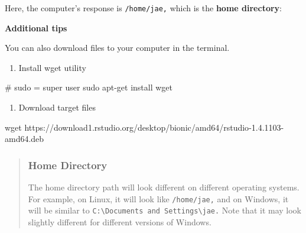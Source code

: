 \documentclass[
  letterpaper,
  DIV=11,
  numbers=noendperiod]{scrreprt}
\newenvironment{Shaded}{\begin{snugshade}}{\end{snugshade}}
\newcommand{\CommentTok}[1]{\textcolor[rgb]{0.37,0.37,0.37}{#1}}
\newcommand{\ExtensionTok}[1]{\textcolor[rgb]{0.00,0.23,0.31}{#1}}
\newcommand{\FunctionTok}[1]{\textcolor[rgb]{0.28,0.35,0.67}{#1}}
\newcommand{\NormalTok}[1]{\textcolor[rgb]{0.00,0.23,0.31}{#1}}
\providecommand{\tightlist}{%
  \setlength{\itemsep}{0pt}\setlength{\parskip}{0pt}}\usepackage{longtable,booktabs,array}
\begin{document}
Here, the computer's response is \texttt{/home/jae,} which is the
\textbf{home directory}:

\begin{Shaded}
\end{Shaded}

\textbf{Additional tips}

You can also download files to your computer in the terminal.

\begin{enumerate}
\def\labelenumi{\arabic{enumi}.}
\tightlist
\item
  Install wget utility
\end{enumerate}

\begin{Shaded}
\begin{Highlighting}[]
\CommentTok{\# sudo = super user }
\FunctionTok{sudo}\NormalTok{ apt{-}get install wget }
\end{Highlighting}
\end{Shaded}

\begin{enumerate}
\def\labelenumi{\arabic{enumi}.}
\setcounter{enumi}{1}
\tightlist
\item
  Download target files
\end{enumerate}

\begin{Shaded}
\begin{Highlighting}[]
\FunctionTok{wget}\NormalTok{ https://download1.rstudio.org/desktop/bionic/amd64/rstudio{-}1.4.1103{-}amd64.deb}
\end{Highlighting}
\end{Shaded}

\begin{quote}
\hypertarget{home-directory}{%
\subsubsection*{Home Directory}\label{home-directory}}

The home directory path will look different on different operating
systems. For example, on Linux, it will look like \texttt{/home/jae,}
and on Windows, it will be similar to
\texttt{C:\textbackslash{}Documents\ and\ Settings\textbackslash{}jae.}
Note that it may look slightly different for different versions of
Windows.
\end{quote}
\end{document}
